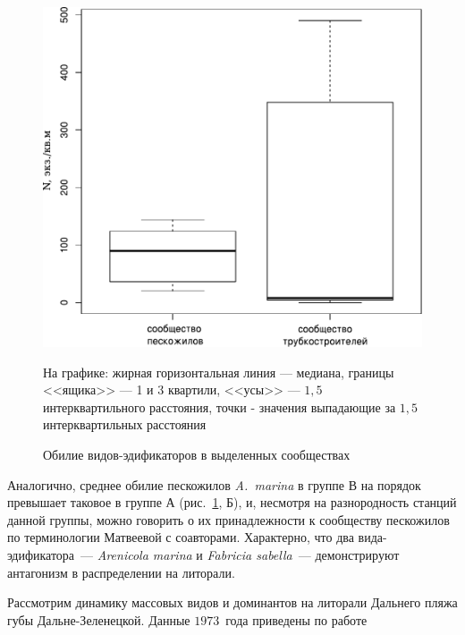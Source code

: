 \begin{figure}[p]
\begin{minipage}[b]{.46\linewidth}
\begin{center}
		\includegraphics[width=\linewidth]{../after_Deryuginskie/2_disser/Arenicola_in_zones1.pdf}
	\end{center}
	\end{minipage}
	\caption{Обилие видов-эдификаторов в выделенных сообществах}
	{\footnotesize На графике: жирная горизонтальная линия --- медиана, границы <<ящика>> --- 1 и 3 квартили, <<усы>> --- $1,5$ интерквартильного расстояния, точки - значения выпадающие за $1,5$ интерквартильных расстояния}
	\label{ris:DZ_edifikatory}
	\end{figure}
Аналогично, среднее обилие пескожилов  \textit{A.~marina} в группе В на порядок превышает таковое в группе А (рис.~\ref{ris:DZ_edifikatory}, Б), и, несмотря на разнородность станций данной группы, можно говорить о их принадлежности к сообществу пескожилов по терминологии Матвеевой с соавторами.
Характерно, что два вида-эдификатора~--- \textit{Arenicola marina} и \textit{Fabricia sabella}~--- демонстрируют антагонизм в распределении на литорали.

Рассмотрим динамику массовых видов и доминантов на литорали Дальнего пляжа губы Дальне-Зеленецкой. 
Данные $1973$~года приведены по работе \cite{Agarova_et_al_1976}

